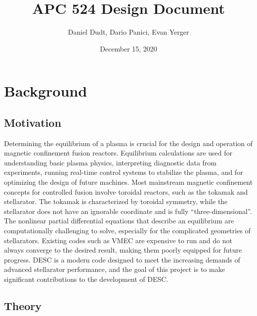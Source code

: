 \documentclass{article}
\title{APC 524 Design Document}
\author{Daniel Dudt, Dario Panici, Evan Yerger}
\date{December 15, 2020}
\begin{document}
\maketitle

\section{Background}

\subsection{Motivation}

Determining the equilibrium of a plasma is crucial for the design and operation of magnetic confinement fusion reactors.
Equilibrium calculations are used for understanding basic plasma physics, interpreting diagnostic data from experiments, running real-time control systems to stabilize the plasma, and for optimizing the design of future machines.
Most mainstream magnetic confinement concepts for controlled fusion involve toroidal reactors, such as the tokamak and stellarator.
The tokamak is characterized by toroidal symmetry, while the stellarator does not have an ignorable coordinate and is fully ``three-dimensional''.
The nonlinear partial differential equations that describe an equilibrium are computationally challenging to solve, especially for the complicated geometries of stellarators.
Existing codes such as VMEC \cite{Hirshman1983} are expensive to run and do not always converge to the desired result, making them poorly equipped for future progress.
DESC \cite{Dudt2020} is a modern code designed to meet the increasing demands of advanced stellarator performance, and the goal of this project is to make significant contributions to the development of DESC.

\subsection{Theory}
\label{sec:theory}
\end{document}
